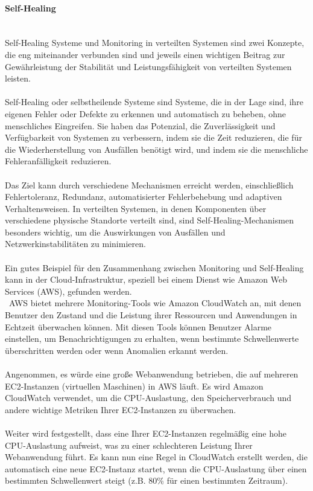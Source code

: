 \paragraph{Self-Healing\\\\}
Self-Healing Systeme und Monitoring in verteilten Systemen sind zwei Konzepte, die eng miteinander verbunden sind und jeweils einen wichtigen Beitrag zur Gewährleistung der Stabilität und Leistungsfähigkeit von verteilten Systemen leisten.
\\\\
Self-Healing oder selbstheilende Systeme sind Systeme, die in der Lage sind, ihre eigenen Fehler oder Defekte zu erkennen und automatisch zu beheben, ohne menschliches Eingreifen. Sie haben das Potenzial, die Zuverlässigkeit und Verfügbarkeit von Systemen zu verbessern, indem sie die Zeit reduzieren, die für die Wiederherstellung von Ausfällen benötigt wird, und indem sie die menschliche Fehleranfälligkeit reduzieren.
\\\\
Das Ziel kann durch verschiedene Mechanismen erreicht werden, einschließlich Fehlertoleranz, Redundanz, automatisierter Fehlerbehebung und adaptiven Verhaltensweisen. In verteilten Systemen, in denen Komponenten über verschiedene physische Standorte verteilt sind, sind Self-Healing-Mechanismen besonders wichtig, um die Auswirkungen von Ausfällen und Netzwerkinstabilitäten zu minimieren.
\\\\
Ein gutes Beispiel für den Zusammenhang zwischen Monitoring und Self-Healing kann in der Cloud-Infrastruktur, speziell bei einem Dienst wie Amazon Web Services (AWS), gefunden werden.
\\\
AWS bietet mehrere Monitoring-Tools wie Amazon CloudWatch an, mit denen Benutzer den Zustand und die Leistung ihrer Ressourcen und Anwendungen in Echtzeit überwachen können. Mit diesen Tools können Benutzer Alarme einstellen, um Benachrichtigungen zu erhalten, wenn bestimmte Schwellenwerte überschritten werden oder wenn Anomalien erkannt werden.
\\\\
Angenommen, es würde  eine große Webanwendung betrieben, die auf mehreren EC2-Instanzen (virtuellen Maschinen) in AWS läuft. Es wird  Amazon CloudWatch verwendet, um die CPU-Auslastung, den Speicherverbrauch und andere wichtige Metriken Ihrer EC2-Instanzen zu überwachen.
\\\\
Weiter wird festgestellt, dass eine Ihrer EC2-Instanzen regelmäßig eine hohe CPU-Auslastung aufweist, was zu einer schlechteren Leistung Ihrer Webanwendung führt. Es kann nun eine Regel in CloudWatch erstellt werden, die automatisch eine neue EC2-Instanz startet, wenn die CPU-Auslastung über einen bestimmten Schwellenwert steigt (z.B. 80\% für einen bestimmten Zeitraum).
